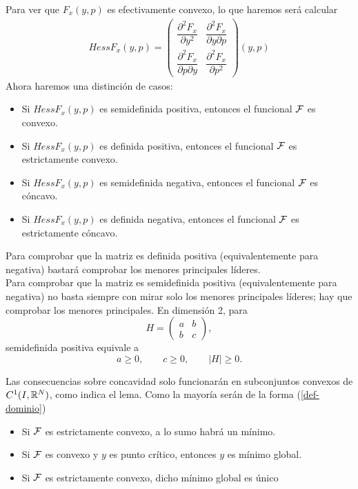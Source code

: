 \documentclass[12pt]{book}
\begin{document}
    \begin{observacion}
        Para ver que $F_x(y,p)$ es efectivamente convexo, lo que haremos será calcular
        \begin{gather*}
            Hess F_x(y,p) = 
            \begin{pmatrix}
                \dfrac{\partial^2 F_x}{\partial y^2} & \dfrac{\partial^2 F_x}{\partial y \partial p}\\
                \dfrac{\partial^2 F_x}{\partial p \partial y} & \dfrac{\partial^2 F_x}{\partial p^2}
            \end{pmatrix} (y,p)
        \end{gather*}
        Ahora haremos una distinción de casos:
        \begin{itemize}
            \item Si $Hess F_x(y,p)$ es semidefinida positiva, entonces el funcional $\mathcal{F}$ es convexo.
            \item Si $Hess F_x(y,p)$ es definida positiva, entonces el funcional $\mathcal{F}$ es estrictamente convexo.
            \item Si $Hess F_x(y,p)$ es semidefinida negativa, entonces el funcional $\mathcal{F}$ es cóncavo.
            \item Si $Hess F_x(y,p)$ es definida negativa, entonces el funcional $\mathcal{F}$ es estrictamente cóncavo.
        \end{itemize}
        Para comprobar que la matriz es definida positiva (equivalentemente para negativa) bastará comprobar los menores principales líderes. \\

        Para comprobar que la matriz es semidefinida positiva (equivalentemente para negativa) no basta siempre con mirar solo los menores principales líderes; hay que comprobar los menores principales.
        En dimensión 2, para
        \[
        H=\begin{pmatrix}a&b\\ b&c\end{pmatrix},
        \]
        semidefinida positiva equivale a
        \[
        a\geq 0,\qquad c\geq 0,\qquad |H|\geq 0.
        \]
        
        Las consecuencias sobre concavidad solo funcionarán en subconjuntos convexos de $C^1(I, \mathbb{R}^N)$, como indica el lema. Como la mayoría serán de la forma (\ref{def-dominio})
    \end{observacion}

    \begin{itemize}
        \item Si $\mathcal{F}$ es estrictamente convexo, a lo sumo habrá un mínimo.
        \item Si $\mathcal{F}$ es convexo y $y$ es punto crítico, entonces $y$ es mínimo global.
        \item Si $\mathcal{F}$ es estrictamente convexo, dicho mínimo global es único
    \end{itemize}
\end{document}
